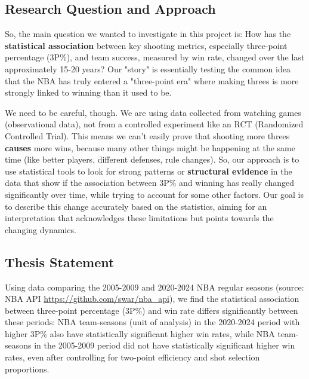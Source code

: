\documentclass[11pt, a4paper]{article} %
\begin{document}
\subsection{Research Question and Approach} %

So, the main question we wanted to investigate in this project is: How has the \textbf{statistical association} between key shooting 
metrics, especially three-point percentage (3P\%), and team success, measured by win rate, changed over the last approximately 
15-20 years? Our "story" is essentially testing the common idea that the NBA has truly entered a "three-point era" where making 
threes is more strongly linked to winning than it used to be.

We need to be careful, though. We are using data collected from watching games (observational data), not from a controlled 
experiment like an RCT (Randomized Controlled Trial). This means we can't easily prove that shooting more threes \textbf{causes} more 
wins, because many other things might be happening at the same time (like better players, different defenses, rule changes). So, 
our approach is to use statistical tools to look for strong patterns or \textbf{structural evidence} in the data that show if the association between 3P\% and winning has really 
changed significantly over time, while trying to account for some other factors. Our goal is to describe this change accurately 
based on the statistics, aiming for an interpretation that acknowledges these limitations but points towards the changing dynamics.

\subsection{Thesis Statement} %
Using data comparing the 2005-2009 and 2020-2024 NBA regular seasons (source: NBA API \href{https://github.com/swar/nba_api}{https://github.com/swar/nba\_api}), we find the statistical association between 
three-point percentage (3P\%) and win rate differs significantly between these periods: NBA team-seasons (unit of analysis) in 
the 2020-2024 period with higher 3P\% also have statistically significant higher win rates, while NBA team-seasons in the 2005-2009 
period did not have statistically significant higher win rates, even after controlling for two-point efficiency and shot selection 
proportions.
\end{document}
